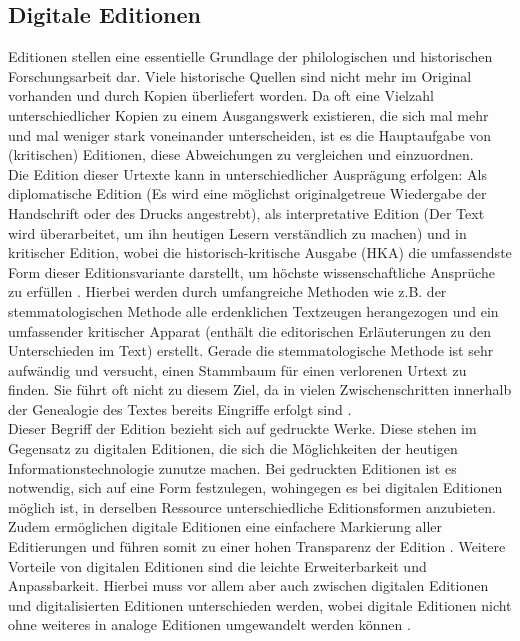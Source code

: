 \documentclass[12pt,a4paper]{article}
\begin{document}
	\subsection{Digitale Editionen}
	Editionen stellen eine essentielle Grundlage der philologischen und historischen Forschungsarbeit dar. 
	Viele historische Quellen sind nicht mehr im Original vorhanden und durch Kopien überliefert worden. 
	Da oft eine Vielzahl unterschiedlicher Kopien zu einem Ausgangswerk existieren, die sich mal mehr und mal weniger stark voneinander unterscheiden, 
	ist es die Hauptaufgabe von (kritischen) Editionen, diese Abweichungen zu vergleichen und einzuordnen. \\
	Die Edition dieser Urtexte kann in unterschiedlicher Ausprägung erfolgen: Als diplomatische Edition 
	(Es wird eine möglichst originalgetreue Wiedergabe der Handschrift oder des Drucks angestrebt), als interpretative Edition (Der Text wird überarbeitet, 
	um ihn heutigen Lesern verständlich zu machen) und in kritischer Edition, wobei die historisch-kritische Ausgabe (HKA) die umfassendste Form dieser 
	Editionsvariante darstellt, um höchste wissenschaftliche Ansprüche zu erfüllen \parencite[S.~236]{SahlDigi2013a}. Hierbei werden durch umfangreiche Methoden wie z.B. 
	der stemmatologischen Methode alle erdenklichen Textzeugen herangezogen und ein umfassender kritischer Apparat (enthält die editorischen Erläuterungen 
	zu den Unterschieden im Text) erstellt. Gerade die stemmatologische Methode ist sehr aufwändig und versucht, einen Stammbaum für einen verlorenen Urtext 
	zu finden. Sie führt oft nicht zu diesem Ziel, da in vielen Zwischenschritten innerhalb der Genealogie des Textes bereits Eingriffe erfolgt sind \parencite[S.~115]{SahlDigi2013a}.\\
	Dieser Begriff der Edition bezieht sich auf gedruckte Werke. Diese stehen im Gegensatz zu digitalen Editionen, die sich die Möglichkeiten der heutigen 
	Informationstechnologie zunutze machen. Bei gedruckten Editionen ist es notwendig, sich auf eine Form festzulegen, wohingegen es bei digitalen Editionen möglich ist, 
	in derselben Ressource unterschiedliche Editionsformen anzubieten. Zudem ermöglichen digitale Editionen eine einfachere Markierung aller Editierungen und führen somit 
	zu einer hohen Transparenz der Edition \parencite[S.~131]{SahlDigi2013b}.  
	Weitere Vorteile von digitalen Editionen sind die leichte Erweiterbarkeit und Anpassbarkeit. Hierbei muss vor allem aber auch zwischen digitalen Editionen und 
	digitalisierten Editionen unterschieden werden, wobei digitale Editionen nicht ohne weiteres in analoge Editionen umgewandelt werden können \parencite[S.~27]{sahle2016}.
	
\end{document}
